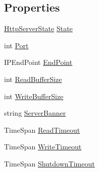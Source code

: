 \subsection*{Properties}
\begin{DoxyCompactItemize}
\item 
\hyperlink{namespace_p_http_a8a92bffd93830785b58d0be3a2f5fdd4}{Http\+Server\+State} \hyperlink{class_p_http_1_1_http_server_a5e98a8056d4f0d14b86083859aecc0a0}{State}
\item 
int \hyperlink{class_p_http_1_1_http_server_a8d71e30f8d73e46a2a0d3bb5fb6b5457}{Port}
\item 
I\+P\+End\+Point \hyperlink{class_p_http_1_1_http_server_a9c58a69090a5c6e881f4dbafdd4f3dd9}{End\+Point}
\item 
int \hyperlink{class_p_http_1_1_http_server_a12d10718594d56e153550c307300e8e0}{Read\+Buffer\+Size}
\item 
int \hyperlink{class_p_http_1_1_http_server_a296fd3deb66496f7645399c84cd56c39}{Write\+Buffer\+Size}
\item 
string \hyperlink{class_p_http_1_1_http_server_a61a7c56daa7d7cd1c8da7bf7a3ff97fc}{Server\+Banner}
\item 
Time\+Span \hyperlink{class_p_http_1_1_http_server_a85559205c80abb794ccde2427a7a4e17}{Read\+Timeout}
\item 
Time\+Span \hyperlink{class_p_http_1_1_http_server_ad359baaa114c854fc79c5aa5db3c91c4}{Write\+Timeout}
\item 
Time\+Span \hyperlink{class_p_http_1_1_http_server_ab9a572c54747bf0d95e58c98759ff8f1}{Shutdown\+Timeout}
\end{DoxyCompactItemize}
